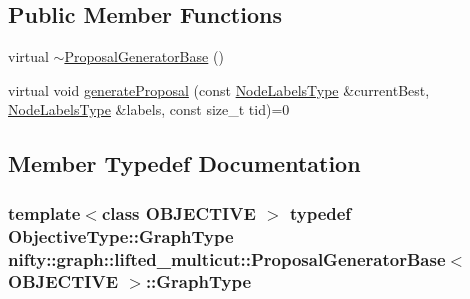 \subsection*{Public Member Functions}
\begin{DoxyCompactItemize}
\item 
virtual \hyperlink{classnifty_1_1graph_1_1lifted__multicut_1_1ProposalGeneratorBase_a58f3f1b445953dc3f80044968b81ce73}{$\sim$\+Proposal\+Generator\+Base} ()
\item 
virtual void \hyperlink{classnifty_1_1graph_1_1lifted__multicut_1_1ProposalGeneratorBase_a7b8e0e7c9da647cb84923119e7f29f7c}{generate\+Proposal} (const \hyperlink{classnifty_1_1graph_1_1lifted__multicut_1_1ProposalGeneratorBase_a15a73233a0b101c39e89b46e9b2cfa7a}{Node\+Labels\+Type} \&current\+Best, \hyperlink{classnifty_1_1graph_1_1lifted__multicut_1_1ProposalGeneratorBase_a15a73233a0b101c39e89b46e9b2cfa7a}{Node\+Labels\+Type} \&labels, const size\+\_\+t tid)=0
\end{DoxyCompactItemize}


\subsection{Member Typedef Documentation}
\hypertarget{classnifty_1_1graph_1_1lifted__multicut_1_1ProposalGeneratorBase_a1c0bd2da212454a26c90f1a1a71249b1}{}
\subsubsection[{Graph\+Type}]{\setlength{\rightskip}{0pt plus 5cm}template$<$class O\+B\+J\+E\+C\+T\+I\+V\+E $>$ typedef Objective\+Type\+::\+Graph\+Type {\bf nifty\+::graph\+::lifted\+\_\+multicut\+::\+Proposal\+Generator\+Base}$<$ O\+B\+J\+E\+C\+T\+I\+V\+E $>$\+::{\bf Graph\+Type}}\label{classnifty_1_1graph_1_1lifted__multicut_1_1ProposalGeneratorBase_a1c0bd2da212454a26c90f1a1a71249b1}
\hypertarget{classnifty_1_1graph_1_1lifted__multicut_1_1ProposalGeneratorBase_aa4fc194ae840428c17220308febac32c}{}
